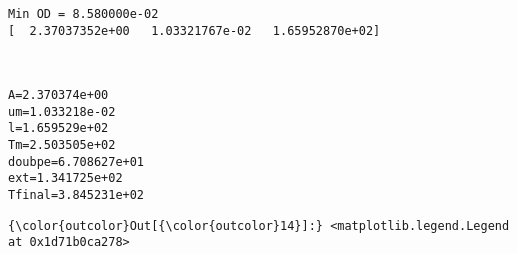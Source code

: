 \documentclass[11pt]{article}
\begin{document}
    \begin{Verbatim}[commandchars=\\\{\}]
Min OD = 8.580000e-02
[  2.37037352e+00   1.03321767e-02   1.65952870e+02]

    \end{Verbatim}

    \begin{center}
    \end{center}
    { \hspace*{\fill} \\}
    
    \begin{Verbatim}[commandchars=\\\{\}]
A=2.370374e+00
um=1.033218e-02
l=1.659529e+02
Tm=2.503505e+02
doubpe=6.708627e+01
ext=1.341725e+02
Tfinal=3.845231e+02

    \end{Verbatim}

            \begin{Verbatim}[commandchars=\\\{\}]
{\color{outcolor}Out[{\color{outcolor}14}]:} <matplotlib.legend.Legend at 0x1d71b0ca278>
\end{Verbatim}
        
    \begin{center}
    \end{center}
    { \hspace*{\fill} \\}
    
    \begin{center}
    \end{center}
    { \hspace*{\fill} \\}
    
\end{document}
